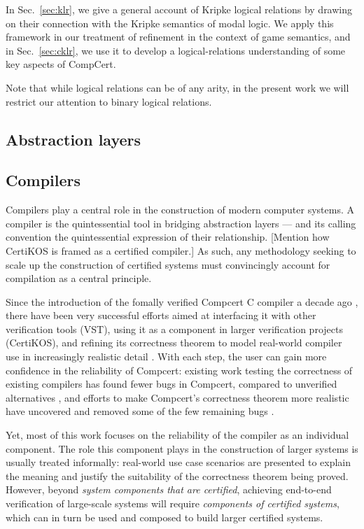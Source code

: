 In Sec.~\ref{sec:klr},
we give a general account of Kripke logical relations
by drawing on their connection with
the Kripke semantics of modal logic.
We apply this framework
in our treatment of refinement
in the context of game semantics,
and in Sec.~\ref{sec:cklr},
we use it to develop a logical-relations
understanding of some key aspects of CompCert.

Note that while logical relations can be of any arity,
in the present work
we will restrict our attention to
binary logical relations.


\subsection{Abstraction layers} %


\subsection{Compilers} %

Compilers play a central role
in the construction of modern computer systems.
A compiler is the quintessential tool
in bridging abstraction layers ---
and its calling convention
the quintessential expression of their relationship.
[Mention how CertiKOS is framed as a certified compiler.]
As such,
any methodology seeking to scale up
the construction of certified systems
must convincingly account for compilation
as a central principle.

Since the introduction of the fomally verified
Compcert C compiler a decade ago \cite{compcert},
there have been very successful efforts aimed at
interfacing it with other verification tools (VST),
using it as a component in larger verification projects (CertiKOS),
and refining its correctness theorem
to model real-world compiler use
in increasingly realistic detail
\cite{qompcert,sepcompcert,compcompcert,compcerttso,compcertshm}.
With each step,
the user can gain more confidence in the reliability of Compcert:
existing work testing the correctness of existing compilers
has found fewer bugs in Compcert,
compared to unverified alternatives \cite{csmith},
and efforts to make Compcert's correctness theorem more realistic
have uncovered and removed some of the few remaining bugs \cite{sepcompcert}.

Yet, most of this work
focuses on the reliability of the compiler
as an individual component.
The role this component plays in the construction of larger systems
is usually treated informally:
real-world use case scenarios are presented
to explain the meaning and justify the suitability
of the correctness theorem being proved.
However,
beyond \emph{system components that are certified},
achieving end-to-end verification of large-scale systems
will require \emph{components of certified systems},
which can in turn be used and composed
to build larger certified systems.

